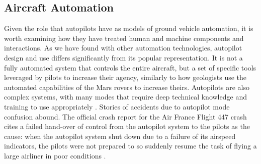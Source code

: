 
\subsection{Aircraft Automation}


Given the role that autopilots have as
models of ground vehicle automation, it is worth examining how they
have treated human and machine components and interactions. As we have
found with other automation
technologies, autopilot design and use differs 
significantly from its popular representation. It is not a fully automated
system that controls the entire aircraft, but a set of specific tools
leveraged by pilots to increase their agency, similarly to how
geologists use the automated capabilities of the Mars rovers to
increase theirs. Autopilots are also complex systems, with many modes
that require deep technical knowledge and training to use
appropriately \cite{harrisPsych}. Stories of accidents
due to autopilot mode confusion abound. The official crash report for
the Air France Flight 447 crash cites a
failed hand-over of control from the autopilot system to the pilots as
the cause:
when the autopilot system shut down due to a failure of its airspeed
indicators, the pilots were not prepared to so suddenly resume the
task of flying a large airliner in poor conditions \cite{AF447}.


